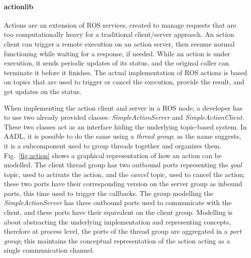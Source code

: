 \paragraph{actionlib} Actions are an extension of ROS services, created to manage requests that are too computationally heavy for a traditional client/server approach. An action client can trigger a remote execution on an action server, then resume normal functioning while waiting for a response, if needed. While an action is under execution, it sends periodic updates of its status, and the original caller can terminate it before it finishes. The actual implementation of ROS actions is based on topics that are used to trigger or cancel the execution, provide the result, and get updates on the status.
 
When implementing the action client and server in a ROS node, a developer has to use two already provided classes: \textit{SimpleActionServer} and \textit{SimpleActionClient}. These two classes act as an interface hiding the underlying topic-based system. In AADL, it is possible to do the same using a \textit{thread group}; as the name suggests, it is a subcomponent used to group threads together and organizes them. Fig.~\ref{fig:action} shows a graphical representation of how an action can be modelled. The client thread group has two outbound ports representing the \textit{goal} topic, used to activate the action, and the \textit{cancel} topic, used to cancel the action; these two ports have their corresponding version on the server group as inbound ports, this time used to trigger the callbacks. The group modelling the \textit{SimpleActionServer} has three outbound ports used to communicate with the client, and these ports have their equivalent on the client group. Modelling is about abstracting the underlying implementation and representing concepts, therefore at process level, the ports of the thread group are aggregated in a \textit{port group}; this maintains the conceptual representation of the action acting as a single communication channel.

